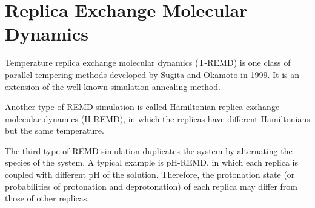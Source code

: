 \section{Replica Exchange Molecular Dynamics\label{Sec:ES:REMD}}
Temperature replica exchange molecular dynamics (T-REMD) is one class of parallel tempering methods developed by Sugita and Okamoto in 1999.\cite{SugitaCPL1999} It is an extension of the well-known simulation annealing method. 


Another type of REMD simulation is called Hamiltonian replica exchange molecular dynamics (H-REMD), in which the replicas have different Hamiltonians but the same temperature. 

The third type of REMD simulation duplicates the system by alternating the species of the system. A typical example is pH-REMD, in which each replica is coupled with different pH of the solution. Therefore, the protonation state (or probabilities of protonation and deprotonation) of each replica may differ from those of other replicas. 